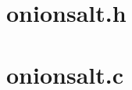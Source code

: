 \documentclass[letterpaper,twocolumn,amsmath,amssymb,pre,aps,10pt]{revtex4-1}
\begin{document}



\appendix

\begin{widetext}

\section{onionsalt.h}



\section{onionsalt.c}



\end{widetext}
\end{document}
